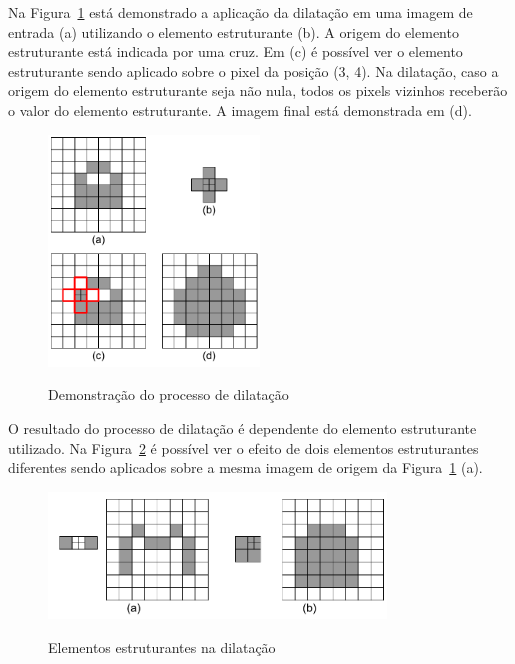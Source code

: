 \documentclass[12pt,oneside,a4paper,english,french,spanish,brazil,]{abntex2}
\begin{document}
Na Figura~\ref{fig:PDI_Dilatacao_1} está demonstrado a aplicação da dilatação em uma imagem de entrada (a) utilizando o elemento estruturante (b). A origem do elemento estruturante está indicada por uma cruz. Em (c) é possível ver o elemento estruturante sendo aplicado sobre o pixel da posição (3, 4). Na dilatação, caso a origem do elemento estruturante seja não nula, todos os pixels vizinhos receberão o valor do elemento estruturante. A imagem final está demonstrada em (d).

\begin{figure}[ht]
\centering
\caption{Demonstração do processo de dilatação}
\includegraphics[width=0.5\textwidth]{imagens/PDI_Dilatacao_1.pdf}
\sourceAuthor
\label{fig:PDI_Dilatacao_1}
\end{figure}

O resultado do processo de dilatação é dependente do elemento estruturante utilizado. Na Figura~\ref{fig:PDI_Dilatacao_2} é possível ver o efeito de dois elementos estruturantes diferentes sendo aplicados sobre a mesma imagem de origem da Figura~\ref{fig:PDI_Dilatacao_1} (a).

\begin{figure}[ht]
\centering
\caption{Elementos estruturantes na dilatação}
\includegraphics[width=0.8\textwidth]{imagens/PDI_Dilatacao_2.pdf}
\sourceAuthor
\label{fig:PDI_Dilatacao_2}
\end{figure}
\end{document}
